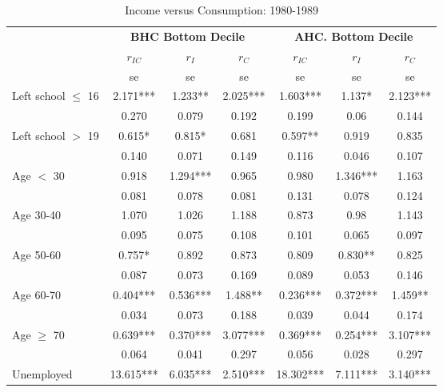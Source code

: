 \begin{table}
\caption{Income versus Consumption: 1980-1989}
\centering
\begin{tabular}{l|ccc|ccc}
\hline\hline 
	& \multicolumn{3}{c}{\textbf{BHC Bottom Decile}} &  \multicolumn{3}{c}{\textbf{AHC. Bottom Decile}} \\
	&	$r_{IC}$	&	$r_{I}$	&	$r_{C}$	&	$r_{IC}$	&	$r_{I}$	&	$r_{C}$	\\
  & se & se & se  & se & se & se \\
\hline
Left school $\leq$ 16	&	       2.171***	&	       1.233** 	&	       2.025***	&	       1.603***	&	       1.137*  	&	       2.123***	\\				
                    	&	       0.270   	&	0.079	&	0.192	&	       0.199   	&	0.06	&	0.144	\\				
Left school $>$ 19	&	       0.615*  	&	       0.815*  	&	0.681	&	       0.597** 	&	0.919	&	0.835	\\				
                    	&	       0.140   	&	0.071	&	0.149	&	       0.116   	&	0.046	&	0.107	\\				
Age $<$ 30	&	       0.918   	&	       1.294***	&	0.965	&	       0.980   	&	       1.346***	&	1.163	\\				
                    	&	       0.081   	&	0.078	&	0.081	&	       0.131   	&	0.078	&	0.124	\\				
Age 30-40	&	       1.070   	&	1.026	&	1.188	&	       0.873   	&	0.98	&	1.143	\\				
                    	&	       0.095   	&	0.075	&	0.108	&	       0.101   	&	0.065	&	0.097	\\				
Age 50-60	&	       0.757*  	&	0.892	&	0.873	&	       0.809   	&	       0.830** 	&	0.825	\\				
                    	&	       0.087   	&	0.073	&	0.169	&	       0.089   	&	0.053	&	0.146	\\				
Age 60-70	&	       0.404***	&	       0.536***	&	       1.488** 	&	       0.236***	&	       0.372***	&	       1.459** 	\\				
                    	&	       0.034   	&	0.073	&	0.188	&	       0.039   	&	0.044	&	0.174	\\				
Age $\geq$ 70	&	       0.639***	&	       0.370***	&	       3.077***	&	       0.369***	&	       0.254***	&	       3.107***	\\				
                    	&	       0.064   	&	0.041	&	0.297	&	       0.056   	&	0.028	&	0.297	\\				
Unemployed	&	      13.615***	&	       6.035***	&	       2.510***	&	      18.302***	&	       7.111***	&	       3.140***	\\				

\end{tabular}
\end{table}
